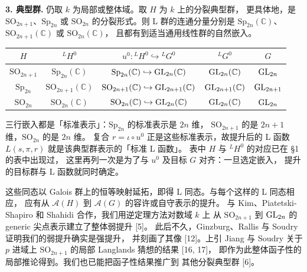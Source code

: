 \par\medskip\noindent\textbf{3. 典型群.}\quad
仍取 $k$ 为局部或整体域。取 $H$ 为 $k$ 上的分裂典型群，
更具体地，是 $\mathrm{SO}_{2n+1}$、$\mathrm{Sp}_{2n}$ 或 $\mathrm{SO}_{2n}$
的分裂形式。则 L 群的连通分量分别是 $\mathrm{Sp}_{2n}(\mathbb{C})$、
$\mathrm{SO}_{2n+1}(\mathbb{C})$ 或 $\mathrm{SO}_{2n}(\mathbb{C})$，
且都有到适当通用线性群的自然嵌入。
\begin{center}
\begin{tabular}{ccccc}
\hline
$H$ & ${}^{L}H^{0}$ & $u^{0}\colon{}^{L}H^{0}\hookrightarrow{}^{L}G^{0}$
  & ${}^{L}G^{0}$ & $G$ \\
\hline
$\mathrm{SO}_{2n+1}$ & $\mathrm{Sp}_{2n}(\mathbb{C})$
  & $\mathrm{Sp}_{2n}(\mathbb{C})\hookrightarrow\mathrm{GL}_{2n}(\mathbb{C})$
  & $\mathrm{GL}_{2n}(\mathbb{C})$ & $\mathrm{GL}_{2n}$ \\
$\mathrm{Sp}_{2n}$ & $\mathrm{SO}_{2n+1}(\mathbb{C})$
  & $\mathrm{SO}_{2n+1}(\mathbb{C})\hookrightarrow\mathrm{GL}_{2n+1}(\mathbb{C})$
  & $\mathrm{GL}_{2n+1}(\mathbb{C})$ & $\mathrm{GL}_{2n+1}$ \\
$\mathrm{SO}_{2n}$ & $\mathrm{SO}_{2n}(\mathbb{C})$
  & $\mathrm{SO}_{2n}(\mathbb{C})\hookrightarrow\mathrm{GL}_{2n}(\mathbb{C})$
  & $\mathrm{GL}_{2n}(\mathbb{C})$ & $\mathrm{GL}_{2n}$ \\
\hline
\end{tabular}
\end{center}
\begin{annote}
三行嵌入都是「标准表示」：$\mathrm{Sp}_{2n}$ 的标准表示是 $2n$ 维，
$\mathrm{SO}_{2n+1}$ 的是 $2n+1$ 维，$\mathrm{SO}_{2n}$ 的是 $2n$ 维。
复合 $r=\iota\circ u^{0}$ 正是这些标准表示，故提升后的 L 函数
$L(s,\pi,r)$ 就是该典型群表示的「标准 L 函数」。
表中 $H$ 与 ${}^{L}H^{0}$ 的对应已在 \S1 的表中出现过，
这里再列一次是为了与 $u^{0}$ 及目标 $G$ 对齐：一旦选定嵌入，
提升的目标群与 L 函数就同时确定。
\par\vspace{0.15em}{\raggedleft 【来源：Borel, Proc.\ Symp.\ Pure Math.\ 33 (1979), \S\,3--4；Cogdell--Kim--Piatetski-Shapiro--Shahidi, Publ.\ Math.\ IHES 93 (2001), \S\,1（A）】\par}
\end{annote}

这些同态以 Galois 群上的恒等映射延拓，即得 L 同态。与每个这样的 L 同态相应，
应有从 $\mathcal{A}(H)$ 到 $\mathcal{A}(G)$ 的容许或自守表示的提升。
与 Kim、Piatetski-Shapiro 和 Shahidi 合作，我们用逆定理方法对数域 $k$ 上
从 $\mathrm{SO}_{2n+1}$ 到 $\mathrm{GL}_{2n}$ 的 generic 尖点表示建立了整体弱提升 [5]。
此后不久，Ginzburg、Rallis 与 Soudry 证明我们的弱提升确实是强提升，
并刻画了其像 [12]。上引 Jiang 与 Soudry 关于 $p$ 进域上
$\mathrm{SO}_{2n+1}$ 的局部 Langlands 猜想的结果 [16, 17]，
即作为此整体函子性的局部推论得到。我们也已能把函子性结果推广到
其他分裂典型群 [6]。

